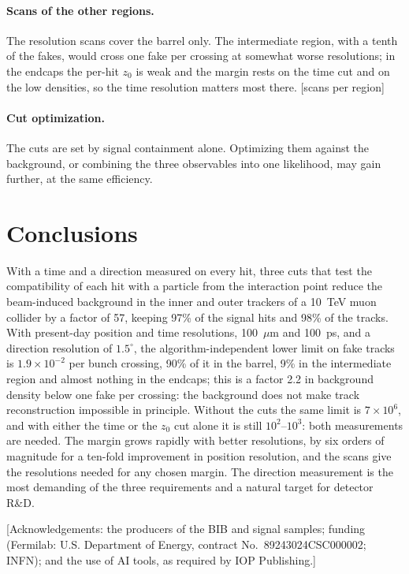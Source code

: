 \IfFileExists{jinst.cls}{\documentclass[a4paper,11pt]{jinst}}
\newcommand{\todo}[1]{\textcolor{red!70!black}{[#1]}}
\begin{document}
\paragraph{Scans of the other regions.} The resolution scans cover the barrel only. The intermediate
region, with a tenth of the fakes, would cross one fake per crossing at somewhat worse resolutions;
in the endcaps the per-hit $z_0$ is weak and the margin rests on the time cut and on the low
densities, so the time resolution matters most there. \todo{scans per region}

\paragraph{Cut optimization.} The cuts are set by signal containment alone. Optimizing them against
the background, or combining the three observables into one likelihood, may gain further, at the
same efficiency.

\section{Conclusions}\label{sec:conclusions}

With a time and a direction measured on every hit, three cuts that test the compatibility of each
hit with a particle from the interaction point reduce the beam-induced background in the inner and
outer trackers of a 10~TeV muon collider by a factor of 57, keeping 97\% of the signal hits and
98\% of the tracks. With present-day position and time resolutions, 100~$\mu$m and
100~ps, and a direction resolution of $1.5^\circ$, the algorithm-independent lower limit on fake
tracks is $1.9\times10^{-2}$ per bunch crossing, 90\% of it in the barrel, 9\% in the intermediate
region and almost nothing in the endcaps; this is a factor 2.2 in background density below one fake
per crossing: the background does not make track reconstruction impossible
in principle. Without the cuts the same limit is $7\times10^{6}$, and with either the time or
the $z_0$ cut alone it is still $10^{2}$--$10^{3}$: both measurements are needed. The margin grows rapidly with better resolutions, by six orders of magnitude for a
ten-fold improvement in position resolution, and the scans give the resolutions needed for any
chosen margin. The direction measurement is the most demanding of the three requirements and a
natural target for detector R\&D.

\acknowledgments
\todo{Acknowledgements: the producers of the BIB and signal samples; funding (Fermilab: U.S.
Department of Energy, contract No.\ 89243024CSC000002; INFN); and the use of AI tools, as required
by IOP Publishing.}
\end{document}
